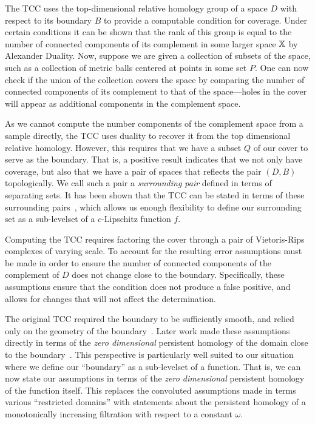 
The TCC uses the top-dimensional relative homology group of a space $D$ with respect to its boundary $B$ to provide a computable condition for coverage.
Under certain conditions it can be shown that the rank of this group is equal to the number of connected components of its complement in some larger space $\mathbb{X}$ by Alexander Duality.
Now, suppose we are given a collection of subsets of the space, such as a collection of metric balls centered at points in some set $P$.
One can now check if the union of the collection covers the space by comparing the number of connected components of its complement to that of the space---holes in the cover will appear as additional components in the complement space.

As we cannot compute the number components of the complement space from a sample directly, the TCC uses duality to recover it from the top dimensional relative homology.
However, this requires that we have a subset $Q$ of our cover to serve as the boundary.
That is, a positive result indicates that we not only have coverage, but also that we have a pair of spaces that reflects the pair $(D, B)$ topologically.
We call such a pair a \emph{surrounding pair} defined in terms of separating sets.
It has been shown that the TCC can be stated in terms of these surrounding pairs~\cite{cavanna2017when}, which allows us enough flexibility to define our surrounding set as a sub-levelset of a $c$-Lipschitz function $f$.

Computing the TCC requires factoring the cover through a pair of Vietoris-Rips complexes of varying scale.
To account for the resulting error assumptions must be made in order to ensure the number of connected components of the complement of $D$ does not change close to the boundary.
Specifically, these assumptions ensure that the condition does not produce a false positive, and allows for changes that will not affect the determination.

The original TCC required the boundary to be sufficiently smooth, and relied only on the geometry of the boundary~\cite{desilva07coverage}.
Later work made these assumptions directly in terms of the \emph{zero dimensional} persistent homology of the domain close to the boundary~\cite{cavanna2017when}.
This perspective is particularly well suited to our situation where we define our ``boundary'' as a sub-levelset of a function.
That is, we can now state our assumptions in terms of the \emph{zero dimensional} persistent homology of the function itself.
This replaces the convoluted assumptions made in terms various ``restricted domains'' with statements about the persistent homology of a monotonically increasing filtration with respect to a constant $\omega$.

